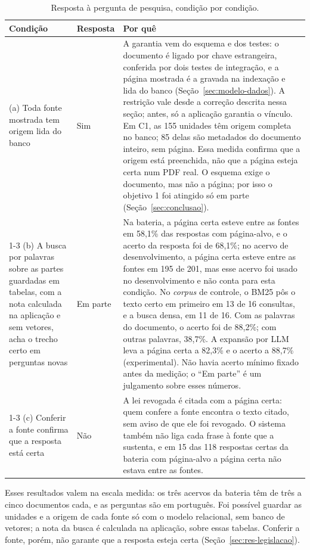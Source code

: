 \documentclass[12pt]{article}
\newcommand{\fonte}{\par\vspace{3pt}{\footnotesize Fonte: o autor.}\par}
\begin{document}
\begin{table}[!htbp]
\centering
\caption{Resposta à pergunta de pesquisa, condição por condição.}
\label{tab:resposta}
\small
\begin{tabular}{p{3.6cm}p{1.6cm}p{8.2cm}}
\toprule
Condição & Resposta & Por quê \\
\midrule
(a) Toda fonte mostrada tem origem lida do banco & Sim & A garantia vem do esquema e dos testes: o documento é ligado por chave estrangeira, conferida por dois testes de integração, e a página mostrada é a gravada na indexação e lida do banco (Seção~\ref{sec:modelo-dados}). A restrição vale desde a correção descrita nessa seção; antes, só a aplicação garantia o vínculo. Em C1, as 155 unidades têm origem completa no banco; 85 delas são metadados do documento inteiro, sem página. Essa medida confirma que a origem está preenchida, não que a página esteja certa num PDF real. O esquema exige o documento, mas não a página; por isso o objetivo 1 foi atingido só em parte (Seção~\ref{sec:conclusao}). \\
\cmidrule(lr){1-3}
(b) A busca por palavras sobre as partes guardadas em tabelas, com a nota calculada na aplicação e sem vetores, acha o trecho certo em perguntas novas & Em parte & Na bateria, a página certa esteve entre as fontes em 58,1\% das respostas com página-alvo, e o acerto da resposta foi de 68,1\%; no acervo de desenvolvimento, a página certa esteve entre as fontes em 195 de 201, mas esse acervo foi usado no desenvolvimento e não conta para esta condição. No \emph{corpus} de controle, o BM25 pôs o texto certo em primeiro em 13 de 16 consultas, e a busca densa, em 11 de 16. Com as palavras do documento, o acerto foi de 88,2\%; com outras palavras, 38,7\%. A expansão por LLM leva a página certa a 82,3\% e o acerto a 88,7\% (experimental). Não havia acerto mínimo fixado antes da medição; o ``Em parte'' é um julgamento sobre esses números. \\
\cmidrule(lr){1-3}
(c) Conferir a fonte confirma que a resposta está certa & Não & A lei revogada é citada com a página certa: quem confere a fonte encontra o texto citado, sem aviso de que ele foi revogado. O sistema também não liga cada frase à fonte que a sustenta, e em 15 das 118 respostas certas da bateria com página-alvo a página certa não estava entre as fontes. \\
\bottomrule
\end{tabular}
\fonte
\end{table}

Esses resultados valem na escala medida: os três acervos da bateria têm de três a cinco documentos cada, e as perguntas são em português. Foi possível guardar as unidades e a origem de cada fonte só com o modelo relacional, sem banco de vetores; a nota da busca é calculada na aplicação, sobre essas tabelas. Conferir a fonte, porém, não garante que a resposta esteja certa (Seção~\ref{sec:res-legislacao}).
\end{document}
